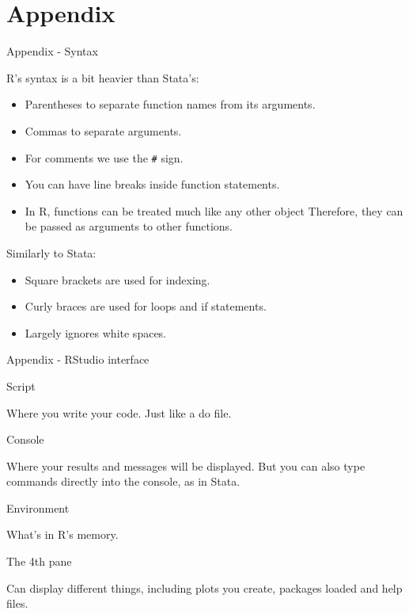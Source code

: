 \documentclass[ignorenonframetext,]{beamer}
\providecommand{\tightlist}{%
  \setlength{\itemsep}{0pt}\setlength{\parskip}{0pt}}
\begin{document}
\section{Appendix}\label{appendix}

\begin{frame}[fragile]{Appendix - Syntax}

R's syntax is a bit heavier than Stata's:

\begin{itemize}
\tightlist
\item
  Parentheses to separate function names from its arguments.
\item
  Commas to separate arguments.
\item
  For comments we use the \texttt{\#} sign.
\item
  You can have line breaks inside function statements.
\item
  In R, functions can be treated much like any other object Therefore,
  they can be passed as arguments to other functions.
\end{itemize}

Similarly to Stata:

\begin{itemize}
\tightlist
\item
  Square brackets are used for indexing.
\item
  Curly braces are used for loops and if statements.
\item
  Largely ignores white spaces.
\end{itemize}

\end{frame}

\begin{frame}{Appendix - RStudio interface}

\begin{block}{Script}

Where you write your code. Just like a do file.

\end{block}

\begin{block}{Console}

Where your results and messages will be displayed. But you can also type
commands directly into the console, as in Stata.

\end{block}

\begin{block}{Environment}

What's in R's memory.

\end{block}

\begin{block}{The 4th pane}

Can display different things, including plots you create, packages
loaded and help files.

\end{block}

\end{frame}
\end{document}
